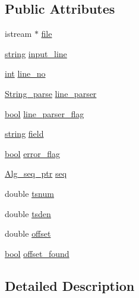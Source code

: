 \subsection*{Public Attributes}
\begin{DoxyCompactItemize}
\item 
istream $\ast$ \hyperlink{class_alg__reader_a1d582d49e3722788198e87a825e59b85}{file}
\item 
\hyperlink{test__lib_f_l_a_c_2format_8c_ab02026ad0de9fb6c1b4233deb0a00c75}{string} \hyperlink{class_alg__reader_a4223f6a0df4bf4aa24de878607dcc89c}{input\+\_\+line}
\item 
\hyperlink{xmltok_8h_a5a0d4a5641ce434f1d23533f2b2e6653}{int} \hyperlink{class_alg__reader_a132fd0277b14ae8820cf098cbe656322}{line\+\_\+no}
\item 
\hyperlink{class_string__parse}{String\+\_\+parse} \hyperlink{class_alg__reader_aa47101fcf6bacfcb6da3a9c2b54fe63f}{line\+\_\+parser}
\item 
\hyperlink{mac_2config_2i386_2lib-src_2libsoxr_2soxr-config_8h_abb452686968e48b67397da5f97445f5b}{bool} \hyperlink{class_alg__reader_a8b518c761b47bbc7ccfb2acff9607880}{line\+\_\+parser\+\_\+flag}
\item 
\hyperlink{test__lib_f_l_a_c_2format_8c_ab02026ad0de9fb6c1b4233deb0a00c75}{string} \hyperlink{class_alg__reader_a8dbbb4d9e645c813f48da19a13a97947}{field}
\item 
\hyperlink{mac_2config_2i386_2lib-src_2libsoxr_2soxr-config_8h_abb452686968e48b67397da5f97445f5b}{bool} \hyperlink{class_alg__reader_a7a8615f50e9603b4727ab2d0e2521fb2}{error\+\_\+flag}
\item 
\hyperlink{allegro_8h_aad5a663237745add3ab7fec40d5f2c87}{Alg\+\_\+seq\+\_\+ptr} \hyperlink{class_alg__reader_a532be6b1a46e36017ac7c1206e53b61b}{seq}
\item 
double \hyperlink{class_alg__reader_a7c8d0fb67e99004db331b113f6d911ec}{tsnum}
\item 
double \hyperlink{class_alg__reader_aa56620c910ea255efb7a8d500369bfa5}{tsden}
\item 
double \hyperlink{class_alg__reader_aa54370e6326e9162b4bf15ed771dadc0}{offset}
\item 
\hyperlink{mac_2config_2i386_2lib-src_2libsoxr_2soxr-config_8h_abb452686968e48b67397da5f97445f5b}{bool} \hyperlink{class_alg__reader_a56a5a6f3c15d1d4dc34dfc7e2ebd4c97}{offset\+\_\+found}
\end{DoxyCompactItemize}


\subsection{Detailed Description}


